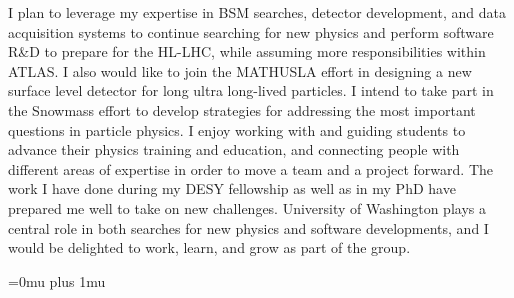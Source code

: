 \documentclass[a4paper]{article}
\begin{document}
\bigskip


I plan to leverage my expertise in BSM searches, detector development, and data acquisition systems to continue searching for new physics and
perform software R\&D to prepare for the HL-LHC, while assuming more responsibilities within ATLAS. I also would like to join the MATHUSLA effort in designing a new surface level detector for long ultra long-lived particles. I intend to take part in the Snowmass effort to develop strategies for addressing the most important questions in particle physics. I enjoy working with and guiding students to advance their physics training and education, and connecting people with different areas of expertise in order to move a team and a project forward. The work I have done during my DESY fellowship as well as in my PhD have prepared me well to take on new challenges. University of Washington plays a central role in both searches for new physics and software developments, and I would be delighted to work, learn, and grow as part of the group.



\Urlmuskip=0mu plus 1mu\relax
{%
\fontsize{11}{14}
\selectfont
}{}

\end{document}
